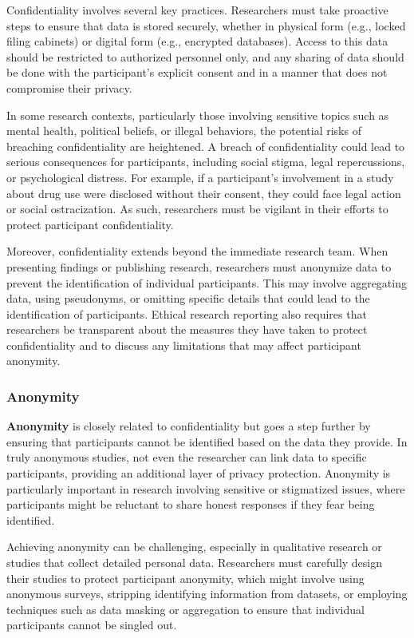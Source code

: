 \documentclass[
]{book}
\begin{document}
Confidentiality involves several key practices. Researchers must take proactive steps to ensure that data is stored securely, whether in physical form (e.g., locked filing cabinets) or digital form (e.g., encrypted databases). Access to this data should be restricted to authorized personnel only, and any sharing of data should be done with the participant's explicit consent and in a manner that does not compromise their privacy.

In some research contexts, particularly those involving sensitive topics such as mental health, political beliefs, or illegal behaviors, the potential risks of breaching confidentiality are heightened. A breach of confidentiality could lead to serious consequences for participants, including social stigma, legal repercussions, or psychological distress. For example, if a participant's involvement in a study about drug use were disclosed without their consent, they could face legal action or social ostracization. As such, researchers must be vigilant in their efforts to protect participant confidentiality.

Moreover, confidentiality extends beyond the immediate research team. When presenting findings or publishing research, researchers must anonymize data to prevent the identification of individual participants. This may involve aggregating data, using pseudonyms, or omitting specific details that could lead to the identification of participants. Ethical research reporting also requires that researchers be transparent about the measures they have taken to protect confidentiality and to discuss any limitations that may affect participant anonymity.

\subsubsection*{Anonymity}\label{anonymity}

\textbf{Anonymity} is closely related to confidentiality but goes a step further by ensuring that participants cannot be identified based on the data they provide. In truly anonymous studies, not even the researcher can link data to specific participants, providing an additional layer of privacy protection. Anonymity is particularly important in research involving sensitive or stigmatized issues, where participants might be reluctant to share honest responses if they fear being identified.

Achieving anonymity can be challenging, especially in qualitative research or studies that collect detailed personal data. Researchers must carefully design their studies to protect participant anonymity, which might involve using anonymous surveys, stripping identifying information from datasets, or employing techniques such as data masking or aggregation to ensure that individual participants cannot be singled out.
\end{document}
